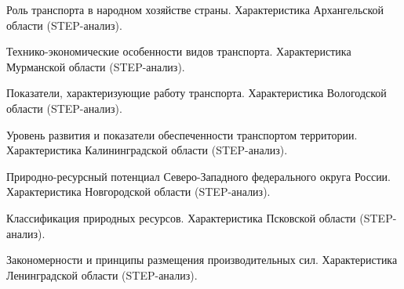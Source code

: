 \documentclass[
	14pt,
	a4paper,
	]
	{scrartcl}
\begin{document}
\vfill

\newpage


\shapk
{}
\setcounter{zad}{0}

\vfill
\z Роль транспорта в народном хозяйстве страны.
 \vfill
\z Характеристика Архангельской области (STEP-анализ).
 \vfill

\vfill

\newpage


\shapk
{}
\setcounter{zad}{0}

\vfill
\z Технико-экономические особенности видов транспорта.
 \vfill
\z Характеристика Мурманской области (STEP-анализ).
 \vfill

\vfill

\newpage


\shapk
{}
\setcounter{zad}{0}

\vfill
\z Показатели, характеризующие работу транспорта.
 \vfill
\z Характеристика Вологодской области (STEP-анализ).
 \vfill

\vfill

\newpage


\shapk
{}
\setcounter{zad}{0}

\vfill
\z Уровень развития и показатели обеспеченности транспортом территории.
 \vfill
\z Характеристика Калининградской области (STEP-анализ).
 \vfill

\vfill

\newpage


\shapk
{}
\setcounter{zad}{0}

\vfill
\z Природно-ресурсный потенциал Северо-Западного федерального округа России.
 \vfill
\z Характеристика Новгородской области (STEP-анализ).
 \vfill

\vfill

\newpage


\shapk
{}
\setcounter{zad}{0}

\vfill
\z Классификация природных ресурсов.
 \vfill
\z Характеристика Псковской области (STEP-анализ).
 \vfill

\vfill

\newpage


\shapk
{}
\setcounter{zad}{0}

\vfill
\z Закономерности и принципы размещения производительных сил.
 \vfill
\z Характеристика Ленинградской области (STEP-анализ).
 \vfill
\end{document}
